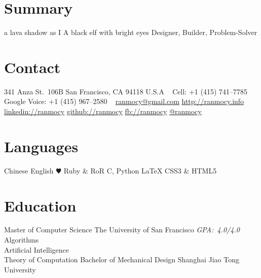 \documentclass[]{friggeri-cv} %
\begin{document}


\begin{aside} %
  \section{Summary}
  a lava shadow as I
  A black elf
  with bright eyes
  Designer, Builder, Problem-Solver
  \section{Contact}
  341 Anza St.\ 106B
  San Francisco, CA 94118
  U.S.A
  ~
  Cell:
  +1 (415) 741--7785
  Google Voice:
  +1 (415) 967--2580
  ~
  \href{mailto:ranmocy@gmail.com}{ranmocy@gmail.com}
  \href{http://ranmocy.info}{http://ranmocy.info}
  \href{http://www.linkedin.com/in/ranmocy}{linkedin://ranmocy}
  \href{https://github.com/ranmocy}{github://ranmocy}
  \href{https://facebook.com/ranmocy}{fb://ranmocy}
  \href{https://twitter.com/ranmocy}{@ranmocy}
  \section{Languages}
  Chinese
  English
  {\color{red} $\varheartsuit$} Ruby \& RoR
  C, Python
  LaTeX
  CSS3 \& HTML5
\end{aside}


\section{Education}

\begin{entrylist}
  {Master \textnormal{of Computer Science}}
  {The University of San Francisco}
  {
    \emph{GPA:~4.0/4.0}\\
    Algorithms\\
    Artificial Intelligence\\
    Theory of Computation
  }
  {Bachelor \textnormal{of Mechanical Design}}
  {Shanghai Jiao Tong University}
  {}
\end{entrylist}
\end{document}
